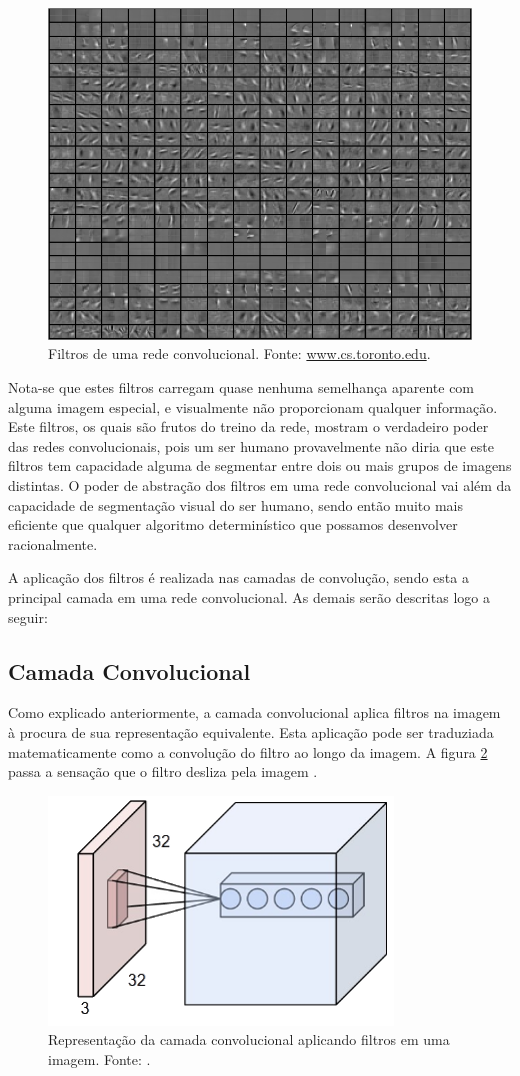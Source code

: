 \documentclass[
	12pt,				%
	oneside,			%
	a4paper,			%
	english,			%
	french,				%
	spanish,			%
	brazil,				%
	]{abntex2}
\begin{document}
\begin{figure}[H]
	\centering
	\includegraphics[width=.5\textwidth]{imagens/filtros2}
	\caption{Filtros de uma rede convolucional. Fonte: \href{www.cs.toronto.edu}{www.cs.toronto.edu}.}
	\label{filtros2}
\end{figure} 

Nota-se que estes filtros carregam quase nenhuma semelhança aparente com alguma imagem especial, e visualmente não proporcionam qualquer informação. Este filtros, os quais são frutos do treino da rede, mostram o verdadeiro poder das redes convolucionais, pois um ser humano provavelmente não diria que este filtros tem capacidade alguma de segmentar entre dois ou mais grupos de imagens distintas. O poder de abstração dos filtros em uma rede convolucional vai além da capacidade de segmentação visual do ser humano, sendo então muito mais eficiente que qualquer algoritmo determinístico que possamos desenvolver racionalmente.

A aplicação dos filtros é realizada nas camadas de convolução, sendo esta a principal camada em uma rede convolucional. As demais serão descritas logo a seguir:

\subsection{Camada Convolucional}
Como explicado anteriormente, a camada convolucional aplica filtros na imagem à procura de sua representação equivalente. Esta aplicação pode ser traduziada matematicamente como a convolução do filtro ao longo da imagem. A figura \ref{camadaconvolucional} passa a sensação que o filtro desliza pela imagem \cite{ref3}.

\begin{figure}[H]
	\centering
	\includegraphics[width=.4\textwidth]{imagens/camadaconvolucional}
	\caption{Representação da camada convolucional aplicando filtros em uma imagem. Fonte: \cite{ref3}.}
	\label{camadaconvolucional}
\end{figure} 
\end{document}
